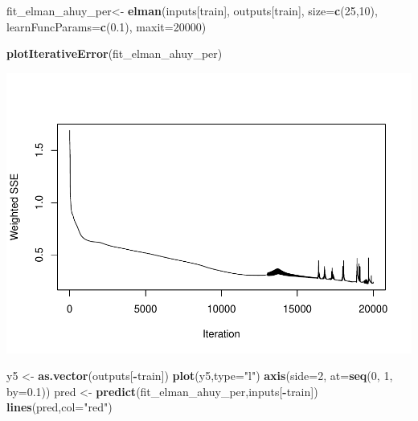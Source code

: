 \documentclass[
]{book}
\newenvironment{Shaded}{\begin{snugshade}}{\end{snugshade}}
\newcommand{\AttributeTok}[1]{\textcolor[rgb]{0.13,0.29,0.53}{#1}}
\newcommand{\DecValTok}[1]{\textcolor[rgb]{0.00,0.00,0.81}{#1}}
\newcommand{\FloatTok}[1]{\textcolor[rgb]{0.00,0.00,0.81}{#1}}
\newcommand{\FunctionTok}[1]{\textcolor[rgb]{0.13,0.29,0.53}{\textbf{#1}}}
\newcommand{\NormalTok}[1]{#1}
\newcommand{\OtherTok}[1]{\textcolor[rgb]{0.56,0.35,0.01}{#1}}
\newcommand{\SpecialCharTok}[1]{\textcolor[rgb]{0.81,0.36,0.00}{\textbf{#1}}}
\newcommand{\StringTok}[1]{\textcolor[rgb]{0.31,0.60,0.02}{#1}}
\begin{document}
\begin{Shaded}
\begin{Highlighting}[]
\NormalTok{fit\_elman\_ahuy\_per}\OtherTok{\textless{}{-}} \FunctionTok{elman}\NormalTok{(inputs[train],}
\NormalTok{                       outputs[train],}
                       \AttributeTok{size=}\FunctionTok{c}\NormalTok{(}\DecValTok{25}\NormalTok{,}\DecValTok{10}\NormalTok{),}
                       \AttributeTok{learnFuncParams=}\FunctionTok{c}\NormalTok{(}\FloatTok{0.1}\NormalTok{),}
                       \AttributeTok{maxit=}\DecValTok{20000}\NormalTok{)}


\FunctionTok{plotIterativeError}\NormalTok{(fit\_elman\_ahuy\_per)}
\end{Highlighting}
\end{Shaded}

\includegraphics{bookdown-demo_files/figure-latex/unnamed-chunk-196-1.pdf}

\begin{Shaded}
\begin{Highlighting}[]
\NormalTok{y5 }\OtherTok{\textless{}{-}} \FunctionTok{as.vector}\NormalTok{(outputs[}\SpecialCharTok{{-}}\NormalTok{train])}
\FunctionTok{plot}\NormalTok{(y5,}\AttributeTok{type=}\StringTok{"l"}\NormalTok{)}
\FunctionTok{axis}\NormalTok{(}\AttributeTok{side=}\DecValTok{2}\NormalTok{, }\AttributeTok{at=}\FunctionTok{seq}\NormalTok{(}\DecValTok{0}\NormalTok{, }\DecValTok{1}\NormalTok{, }\AttributeTok{by=}\FloatTok{0.1}\NormalTok{))}
\NormalTok{pred }\OtherTok{\textless{}{-}} \FunctionTok{predict}\NormalTok{(fit\_elman\_ahuy\_per,inputs[}\SpecialCharTok{{-}}\NormalTok{train])}
\FunctionTok{lines}\NormalTok{(pred,}\AttributeTok{col=}\StringTok{"red"}\NormalTok{)}
\end{Highlighting}
\end{Shaded}
\end{document}
